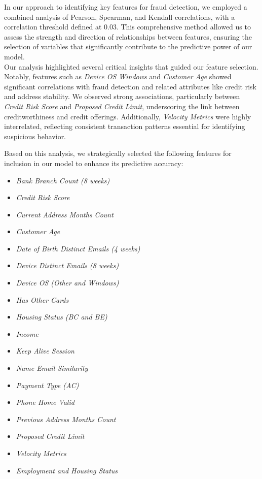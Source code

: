 \documentclass[12pt,a4paper]{report}
\begin{document}
In our approach to identifying key features for fraud detection, we employed a combined analysis of Pearson, Spearman, and Kendall correlations, with a correlation threshold defined at 0.03. This comprehensive method allowed us to assess the strength and direction of relationships between features, ensuring the selection of variables that significantly contribute to the predictive power of our model.\\

Our analysis highlighted several critical insights that guided our feature selection. Notably, features such as \textit{Device OS Windows} and \textit{Customer Age} showed significant correlations with fraud detection and related attributes like credit risk and address stability. We observed strong associations, particularly between \textit{Credit Risk Score} and \textit{Proposed Credit Limit}, underscoring the link between creditworthiness and credit offerings. Additionally, \textit{Velocity Metrics} were highly interrelated, reflecting consistent transaction patterns essential for identifying suspicious behavior.

Based on this analysis, we strategically selected the following features for inclusion in our model to enhance its predictive accuracy:

\begin{itemize}
    \item \textit{Bank Branch Count (8 weeks)}
    \item \textit{Credit Risk Score}
    \item \textit{Current Address Months Count}
    \item \textit{Customer Age}
    \item \textit{Date of Birth Distinct Emails (4 weeks)}
    \item \textit{Device Distinct Emails (8 weeks)}
    \item \textit{Device OS (Other and Windows)}
    \item \textit{Has Other Cards}
    \item \textit{Housing Status (BC and BE)}
    \item \textit{Income}
    \item \textit{Keep Alive Session}
    \item \textit{Name Email Similarity}
    \item \textit{Payment Type (AC)}
    \item \textit{Phone Home Valid}
    \item \textit{Previous Address Months Count}
    \item \textit{Proposed Credit Limit}
    \item \textit{Velocity Metrics}
    \item \textit{Employment and Housing Status}
\end{itemize}
\end{document}
